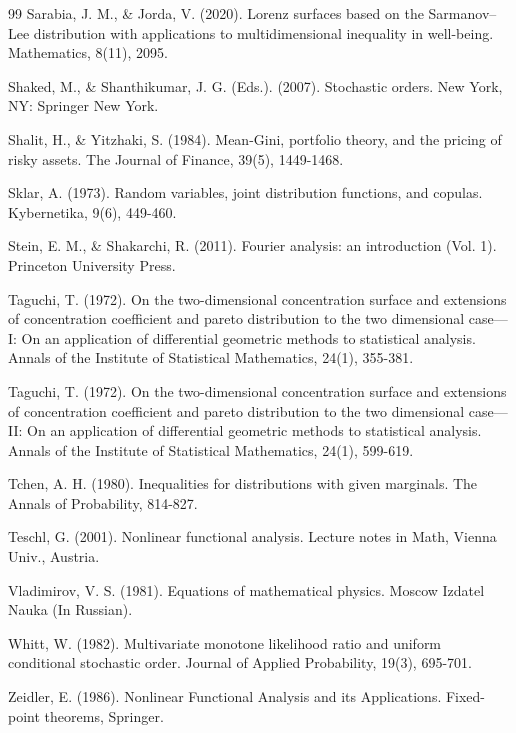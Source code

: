 \documentclass[onecolumn]{article}
\begin{document}
\begin{thebibliography}{99}
\bibitem{[6]} Sarabia, J. M., \& Jorda, V. (2020). Lorenz surfaces based on
the Sarmanov--Lee distribution with applications to multidimensional
inequality in well-being. Mathematics, 8(11), 2095.

\bibitem{[24]} Shaked, M., \& Shanthikumar, J. G. (Eds.). (2007). Stochastic
orders. New York, NY: Springer New York.

\bibitem{[43]} Shalit, H., \& Yitzhaki, S. (1984). Mean-Gini, portfolio
theory, and the pricing of risky assets. The Journal of Finance, 39(5),
1449-1468.

\bibitem{[42]} Sklar, A. (1973). Random variables, joint distribution
functions, and copulas. Kybernetika, 9(6), 449-460.

\bibitem{[74]} Stein, E. M., \& Shakarchi, R. (2011). Fourier analysis: an
introduction (Vol. 1). Princeton University Press.

\bibitem{[7]} Taguchi, T. (1972). On the two-dimensional concentration
surface and extensions of concentration coefficient and pareto distribution
to the two dimensional case---I: On an application of differential geometric
methods to statistical analysis. Annals of the Institute of Statistical
Mathematics, 24(1), 355-381.

\bibitem{[8]} Taguchi, T. (1972). On the two-dimensional concentration
surface and extensions of concentration coefficient and pareto distribution
to the two dimensional case---II: On an application of differential
geometric methods to statistical analysis. Annals of the Institute of
Statistical Mathematics, 24(1), 599-619.

\bibitem{[30]} Tchen, A. H. (1980). Inequalities for distributions with
given marginals. The Annals of Probability, 814-827.

\bibitem{[70]} Teschl, G. (2001). Nonlinear functional analysis. Lecture
notes in Math, Vienna Univ., Austria.

\bibitem{[15]} Vladimirov, V. S. (1981). Equations of mathematical physics.
Moscow Izdatel Nauka (In Russian).

\bibitem{[71]} Whitt, W. (1982). Multivariate monotone likelihood ratio and
uniform conditional stochastic order. Journal of Applied Probability, 19(3),
695-701.

\bibitem{[50]} Zeidler, E. (1986). Nonlinear Functional Analysis and its
Applications. Fixed-point theorems, Springer.
\end{thebibliography}

\newpage
\end{document}
